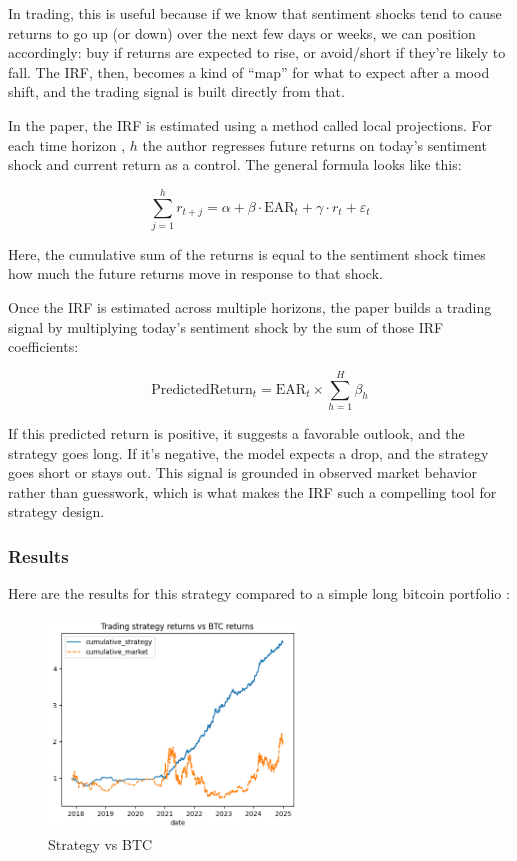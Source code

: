 \documentclass[
  a4paper]{article}
\begin{document}
In trading, this is useful because if we know that sentiment shocks tend
to cause returns to go up (or down) over the next few days or weeks, we
can position accordingly: buy if returns are expected to rise, or
avoid/short if they're likely to fall. The IRF, then, becomes a kind of
``map'' for what to expect after a mood shift, and the trading signal is
built directly from that.

In the paper, the IRF is estimated using a method called local
projections. For each time horizon , \(h\) the author regresses future
returns on today's sentiment shock and current return as a control. The
general formula looks like this:

\[
\sum_{j=1}^{h} r_{t+j} = \alpha + \beta \cdot \text{EAR}_t + \gamma \cdot r_t + \varepsilon_t
\]

Here, the cumulative sum of the returns is equal to the sentiment shock
times how much the future returns move in response to that shock.

Once the IRF is estimated across multiple horizons, the paper builds a
trading signal by multiplying today's sentiment shock by the sum of
those IRF coefficients:

\[
\text{PredictedReturn}_t = \text{EAR}_t \times \sum_{h=1}^{H} \beta_h
\]

If this predicted return is positive, it suggests a favorable outlook,
and the strategy goes long. If it's negative, the model expects a drop,
and the strategy goes short or stays out. This signal is grounded in
observed market behavior rather than guesswork, which is what makes the
IRF such a compelling tool for strategy design.

\hypertarget{results-2}{%
\subsubsection{Results}\label{results-2}}

Here are the results for this strategy compared to a simple long bitcoin
portfolio :\\

\begin{figure}

{\centering \includegraphics[width=2.60417in,height=\textheight]{graphs/strat.png}

}

\caption{Strategy vs BTC}

\end{figure}
\end{document}
